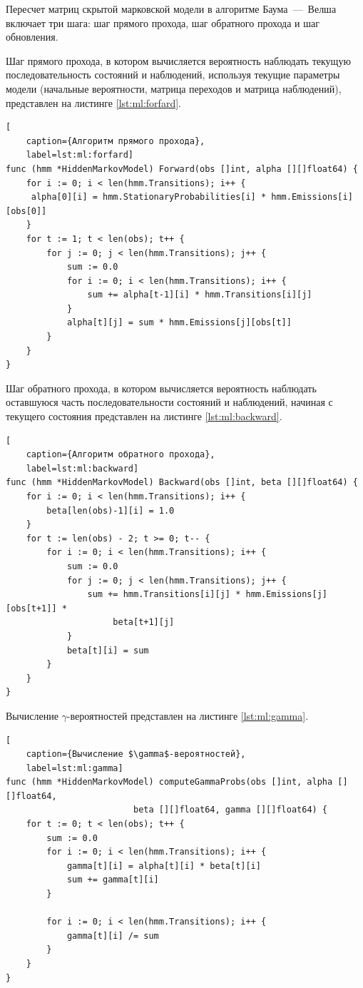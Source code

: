 Пересчет матриц скрытой марковской модели в алгоритме Баума~---~Велша включает три шага: шаг прямого прохода, шаг обратного прохода и шаг обновления.

Шаг прямого прохода, в котором вычисляется вероятность наблюдать текущую последовательность состояний и наблюдений, используя текущие параметры модели (начальные вероятности, матрица переходов и матрица наблюдений), представлен на листинге \ref{lst:ml:forfard}.
\begin{lstlisting}[
	caption={Алгоритм прямого прохода},
	label=lst:ml:forfard]
func (hmm *HiddenMarkovModel) Forward(obs []int, alpha [][]float64) {
	for i := 0; i < len(hmm.Transitions); i++ {
	 alpha[0][i] = hmm.StationaryProbabilities[i] * hmm.Emissions[i][obs[0]]
	}
	for t := 1; t < len(obs); t++ {
		for j := 0; j < len(hmm.Transitions); j++ {
			sum := 0.0
			for i := 0; i < len(hmm.Transitions); i++ {
				sum += alpha[t-1][i] * hmm.Transitions[i][j]
			}
			alpha[t][j] = sum * hmm.Emissions[j][obs[t]]
		}
	}
}
\end{lstlisting}
Шаг обратного прохода, в котором вычисляется вероятность наблюдать оставшуюся часть последовательности состояний и наблюдений, начиная с текущего состояния представлен на листинге \ref{lst:ml:backward}.
\begin{lstlisting}[
	caption={Алгоритм обратного прохода},
	label=lst:ml:backward]
func (hmm *HiddenMarkovModel) Backward(obs []int, beta [][]float64) {
	for i := 0; i < len(hmm.Transitions); i++ {
		beta[len(obs)-1][i] = 1.0
	}
	for t := len(obs) - 2; t >= 0; t-- {
		for i := 0; i < len(hmm.Transitions); i++ {
			sum := 0.0
			for j := 0; j < len(hmm.Transitions); j++ {
				sum += hmm.Transitions[i][j] * hmm.Emissions[j][obs[t+1]] *
					 beta[t+1][j]
			}
			beta[t][i] = sum
		}
	}
}
\end{lstlisting}
Вычисление $\gamma$-вероятностей представлен на листинге \ref{lst:ml:gamma}.
\begin{lstlisting}[
	caption={Вычисление $\gamma$-вероятностей},
	label=lst:ml:gamma]
func (hmm *HiddenMarkovModel) computeGammaProbs(obs []int, alpha [][]float64,
						 beta [][]float64, gamma [][]float64) {
	for t := 0; t < len(obs); t++ {
		sum := 0.0
		for i := 0; i < len(hmm.Transitions); i++ {
			gamma[t][i] = alpha[t][i] * beta[t][i]
			sum += gamma[t][i]
		}
		
		for i := 0; i < len(hmm.Transitions); i++ {
			gamma[t][i] /= sum
		}
	}
}
\end{lstlisting}


